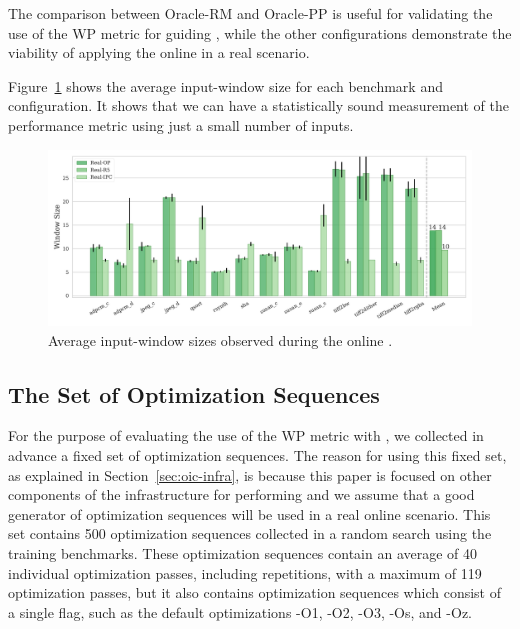 The comparison between Oracle-RM and Oracle-PP is useful for validating the use of the WP metric for guiding {\itercomp}, while the other configurations demonstrate the viability of applying the online {\itercomp} in a real scenario.

Figure~\ref{fig:window-size} shows the average input-window size for each benchmark and configuration.
It shows that we can have a statistically sound measurement of the performance metric using just a small number of inputs.

\begin{figure}[htb]
    \centering
    \includegraphics[width=\textwidth]{figs/window-size.pdf}
    \caption{Average input-window sizes observed during the online {\itercomp}.}
    \label{fig:window-size}
\end{figure}

\subsection{The Set of Optimization Sequences}

For the purpose of evaluating the use of the WP metric with {\itercomp}, we collected in advance a fixed set of optimization sequences.
The reason for using this fixed set, as explained in Section~\ref{sec:oic-infra}, is because this paper is focused on other components of the infrastructure for performing {\itercomp} and we assume that a good generator of optimization sequences will be used in a real online scenario.
This set contains 500 optimization sequences collected in a random search using the training benchmarks.
These optimization sequences contain an average of 40 individual optimization passes, including repetitions, with a maximum of 119 optimization passes, but it also contains optimization sequences which consist of a single flag, such as the default optimizations {\flagstype -O1}, {\flagstype -O2}, {\flagstype -O3}, {\flagstype -Os}, and {\flagstype -Oz}.

